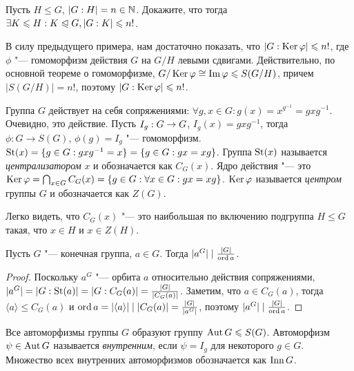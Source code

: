 \begin{exercise}
	Пусть $H \le G$, $|G : H| = n \in \mathbb{N}$. Докажите, что тогда $\exists K \le H: K \hm\normal G, |G : K| \le n!$.
\end{exercise}

\begin{solution}
	В силу предыдущего примера, нам достаточно показать, что $|G : \operatorname{Ker}\varphi| \leqslant n!$, где $\phi$ "--- гомоморфизм действия $G$ на $G / H$ левыми сдвигами. Действительно, по основной теореме о гомоморфизме, $G / \operatorname{Ker}\varphi \cong \operatorname{Im}\varphi \leqslant S(G / H)$, причем $|S(G / H)| = n!$, поэтому $|G : \operatorname{Ker}\varphi| \leqslant n!$.
\end{solution}

\begin{example}
	Группа $G$ действует на себя сопряжениями: $\forall g, x \in G: g(x) = x^{g^{-1}} = gxg^{-1}$. Очевидно, это действие. Пусть $I_g: G \hm\to G$, $I_g(x) = gxg^{-1}$, тогда $\phi: G \to S(G)$, $\phi(g) = I_g$ "--- гомоморфизм. $\operatorname{St}(x) = \{g \in G: gxg^{-1} = x\} = \{g \in G: gx = xg\}$. Группа $\operatorname{St}(x)$ называется \textit{централизатором} $x$ и обозначается как $C_G(x)$. Ядро действия "--- это $\ke\phi \hm= \bigcap_{x \in G} C_G(x) \hm= \{g \in G: \forall x \in G: gx = xg\}$. $\operatorname{Ker}\varphi$ называется \textit{центром} группы $G$ и обозначается как $Z(G)$.
\end{example}

\begin{note}
	Легко видеть, что $C_G(x)$ "--- это наибольшая по включению подгруппа $H \le G$ такая, что $x \in H$ и $x \in Z(H)$.
\end{note}

\begin{proposition}
	Пусть $G$ "--- конечная группа, $a \in G$. Тогда $|a^G| \mid \frac{|G|}{\operatorname{ord} a}$.
\end{proposition}

\begin{proof}
	Поскольку $a^G$ "--- орбита $a$ относительно действия сопряжениями, $|a^G| \hm= |G : \St(a)| = |G : C_G(a)| = \frac{|G|}{|C_G(a)|}$. Заметим, что $a \in C_G(a)$, тогда $\langle a \rangle \le C_G(a)$ и $\ord{a} \hm= |\langle a \rangle| \mid |C_G(a)| = \frac{|G|}{|a^G|}$, поэтому $|a^G| \mid \frac{|G|}{\operatorname{ord} a}$.
\end{proof}

\begin{definition}
	Все автоморфизмы группы $G$ образуют группу $\operatorname{Aut} G \leqslant S(G)$. Автоморфизм $\psi \in \operatorname{Aut} G$ называется \textit{внутренним}, если $\psi = I_g$ для некоторого $g \in G$. Множество всех внутренних автоморфизмов обозначается как $\operatorname{Inn} G$.
\end{definition}

